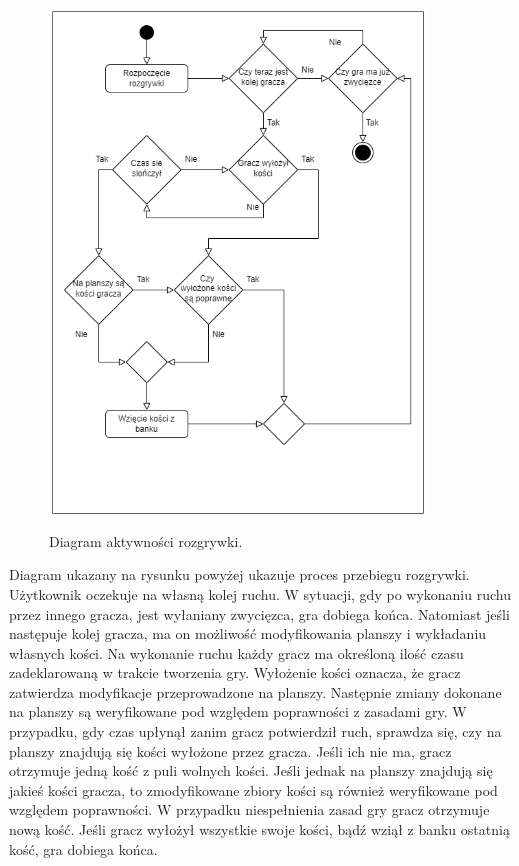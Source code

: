 \begin{figure}[h!]
	\begin{center}
		\includegraphics[width=10cm,height=14cm]{img/activity-diagram-game.png}
	\end{center}
	\caption{{\color{dgray} Diagram aktywności rozgrywki.}} 
	\label{diagram-aktywnosci-game}
\end{figure}  

Diagram ukazany na rysunku powyżej ukazuje proces przebiegu rozgrywki. Użytkownik oczekuje na własną kolej ruchu. W sytuacji, gdy po wykonaniu ruchu przez innego gracza, jest wyłaniany zwycięzca, gra dobiega końca. Natomiast jeśli następuje kolej gracza, ma on możliwość modyfikowania planszy i wykładaniu własnych kości. Na wykonanie ruchu każdy gracz ma określoną ilość czasu zadeklarowaną w trakcie tworzenia gry. Wyłożenie kości oznacza, że gracz zatwierdza modyfikacje przeprowadzone na planszy. Następnie zmiany dokonane na planszy są weryfikowane pod względem poprawności z zasadami gry. W przypadku, gdy czas upłynął zanim gracz potwierdził ruch, sprawdza się, czy na planszy znajdują się kości wyłożone przez gracza. Jeśli ich nie ma, gracz otrzymuje jedną kość z puli wolnych kości. Jeśli jednak na planszy znajdują się jakieś kości gracza, to zmodyfikowane zbiory kości są również weryfikowane pod względem poprawności. W przypadku niespełnienia zasad gry gracz otrzymuje nową kość. 
Jeśli gracz wyłożył wszystkie swoje kości, bądź wziął z banku ostatnią kość, gra dobiega końca.


